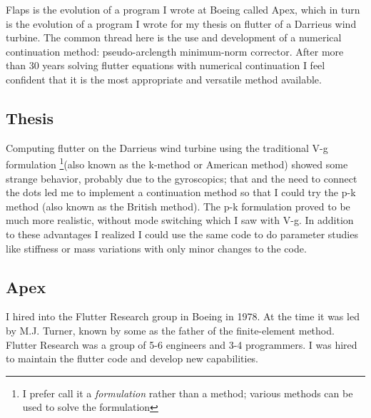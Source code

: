 \documentclass[11pt,openany,twoside]{book}
\numberwithin{equation}{section}		%
\begin{document}
Flaps is the evolution of a program I wrote at Boeing called Apex,
which in turn is the evolution of a program I wrote for my thesis on
flutter of a Darrieus wind turbine.
The common thread here is the use and development of a numerical continuation
method: pseudo-arclength minimum-norm corrector.
After more than 30 years solving flutter equations with numerical continuation
I feel confident that it is the most appropriate and versatile method available.

\subsection{Thesis}
Computing flutter on the Darrieus wind turbine using the traditional
V-g formulation \footnote{I prefer call it a \emph{formulation} rather than a method;
various methods can be used to solve the formulation}(also known as the k-method or
American method) showed some strange behavior, probably due to the gyroscopics;
that and the need to connect the dots led me to implement a continuation method so
that I could try the p-k method \cite{hassig1971approximate} (also known as the British method).
The p-k formulation proved to be
much more realistic, without mode switching which I saw with V-g.
In addition to these advantages I realized I could use the same code
to do parameter studies like stiffness or mass variations with only
minor changes to the code.

\subsection{Apex}
I hired into the Flutter Research group in Boeing in 1978. At the time it was
led by M.J. Turner, known by some as the father of the finite-element method.
Flutter Research was a group of 5-6 engineers and 3-4 programmers.
I was hired to maintain the flutter code and develop new capabilities.
\end{document}
